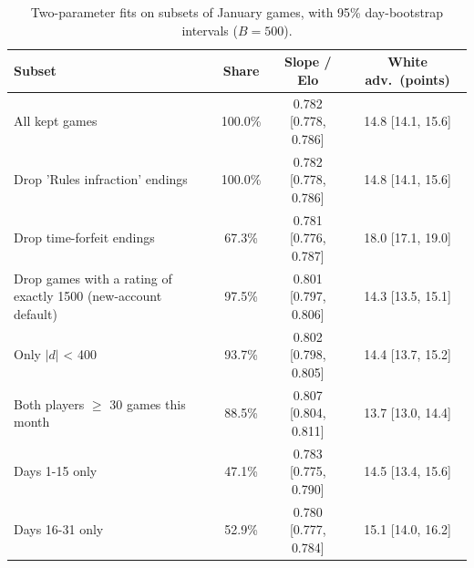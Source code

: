 \begin{table}[h]
\centering\small
\caption{Two-parameter fits on subsets of January games, with 95\% day-bootstrap intervals ($B = 500$).}
\label{tab:sens}
\begin{tabular}{lccc}
\toprule
Subset & Share & Slope / Elo & White adv.\ (points) \\
\midrule
All kept games & 100.0\% & 0.782 [0.778, 0.786] & 14.8 [14.1, 15.6] \\
Drop 'Rules infraction' endings & 100.0\% & 0.782 [0.778, 0.786] & 14.8 [14.1, 15.6] \\
Drop time-forfeit endings & 67.3\% & 0.781 [0.776, 0.787] & 18.0 [17.1, 19.0] \\
Drop games with a rating of exactly 1500 (new-account default) & 97.5\% & 0.801 [0.797, 0.806] & 14.3 [13.5, 15.1] \\
Only $|d|$ < 400 & 93.7\% & 0.802 [0.798, 0.805] & 14.4 [13.7, 15.2] \\
Both players $\geq$ 30 games this month & 88.5\% & 0.807 [0.804, 0.811] & 13.7 [13.0, 14.4] \\
Days 1-15 only & 47.1\% & 0.783 [0.775, 0.790] & 14.5 [13.4, 15.6] \\
Days 16-31 only & 52.9\% & 0.780 [0.777, 0.784] & 15.1 [14.0, 16.2] \\
\bottomrule
\end{tabular}
\end{table}
